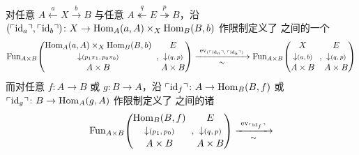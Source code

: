 \begin{theorem}[模的 \trYonedaLemma]\label{thm:yoneda-for-modules}
对任意\trSpan{} $A\overset{a}{\leftarrow}X\overset{b}{\rightarrow}B$ 与任意%
\trModule{}
$A\overset{q}{\twoheadleftarrow}E\overset{p}{\twoheadrightarrow}B$，沿
$(\ulcorner\mathrm{id}_{a}\urcorner,\ulcorner\mathrm{id}_{b}\urcorner)\colon X\to\mathrm{Hom}_{A}(a,A)\times_{X}\mathrm{Hom}_{B}(B,b)$ 作限制定义了%
\trKanComplex{}之间的一个\trEquivalence
{\small\[
\mathrm{Fun}_{A\times B}\!\left(
\begin{gathered}
\mathrm{Hom}_{A}(a,A)\times_{X}\mathrm{Hom}_{B}(B,b)\\[-2pt]
\downarrow\scriptstyle (p_{1}\pi_{1},\,p_{0}\pi_{0})\\[-2pt]
A\times B
\end{gathered}
\;\right.,
\left.
\begin{gathered}
E\\[-2pt]
\downarrow\scriptstyle (q,\,p)\\[-2pt]
A\times B
\end{gathered}
\right)
\xrightarrow[\ \sim\ ]{\ \mathrm{ev}_{(\qcor{\mathrm{id}_{a}},\,\qcor{\mathrm{id}_{b}})}\ }
\mathrm{Fun}_{A\times B}\!\left(
\begin{gathered}
X\\[-2pt]
\downarrow\scriptstyle (a,\,b)\\[-2pt]
A\times B
\end{gathered}
\;\right.,
\left.
\begin{gathered}
E\\[-2pt]
\downarrow\scriptstyle (q,\,p)\\[-2pt]
A\times B
\end{gathered}
\right)
\]}
而对任意\trFunctor{} $f\colon A\to B$ 或 $g\colon B\to A$，沿
$\ulcorner\mathrm{id}_{f}\urcorner\colon A\to\mathrm{Hom}_{B}(B,f)$ 或
$\ulcorner\mathrm{id}_{g}\urcorner\colon B\to\mathrm{Hom}_{A}(g,A)$ 作限制定义了%
\trKanComplex{}之间的诸\trEquivalence
{\small\[
\mathrm{Fun}_{A\times B}\!\left(
\begin{gathered}
\mathrm{Hom}_{B}(B,f)\\[-2pt]
\downarrow\scriptstyle (p_{1},\,p_{0})\\[-2pt]
A\times B
\end{gathered}
\;\right.,
\left.
\begin{gathered}
E\\[-2pt]
\downarrow\scriptstyle (q,\,p)\\[-2pt]
A\times B
\end{gathered}
\right)
\xrightarrow[\ \sim\ ]{\ \mathrm{ev}_{\qcor{\mathrm{id}_{f}}}\ }
\]}
\end{theorem}
